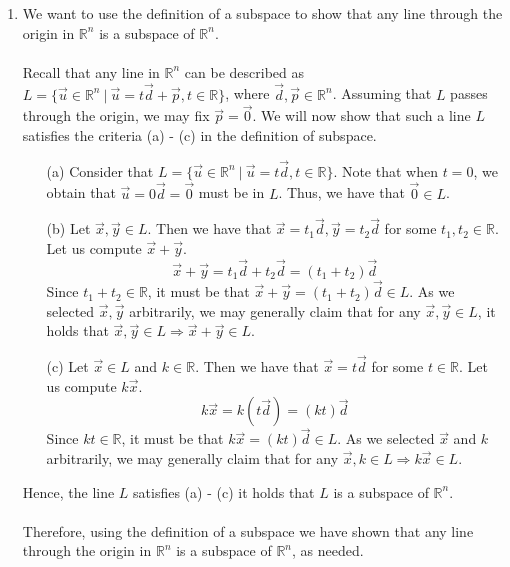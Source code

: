 \begin{SaveQuestion}
\begin{enumerate}
\begin{itemize}
        \end{itemize}
        \item We want to use the definition of a subspace to show that any line through the origin in $\mathbb{R}^n$ is a subspace of $\mathbb{R}^n$. \\ \\
        Recall that any line in $\mathbb{R}^n$ can be described as $L = \{\vec u \in \mathbb{R}^n \ | \ \vec u = t\vec d + \vec p, t \in \mathbb{R}\}$, where $\vec d, \vec p \in \mathbb{R}^n$. Assuming that $L$ passes through the origin, we may fix $\vec p = \vec 0$. We will now show that such a line $L$ satisfies the criteria (a) - (c) in the definition of subspace.
        \begin{enumerate}
            \item[(a)] Consider that $L = \{\vec u \in \mathbb{R}^n \ | \ \vec u = t\vec d, t \in \mathbb{R}\}$. Note that when $t = 0$, we obtain that $\vec u = 0 \vec d = \vec 0$ must be in $L$. Thus, we have that $\vec 0 \in L$. 
            \item[(b)] Let $\vec x, \vec y \in L$. Then we have that $\vec x = t_1 \vec d, \vec y = t_2 \vec d$ for some $t_1, t_2 \in \mathbb{R}$. Let us compute $\vec x + \vec y$. 
            $$\vec x + \vec y = t_1 \vec d + t_2 \vec d = (t_1 + t_2) \vec d$$
            Since $t_1 + t_2 \in \mathbb{R}$, it must be that $\vec x + \vec y = (t_1 + t_2)\vec d \in L$. As we selected $\vec x, \vec y$ arbitrarily, we may generally claim that for any $\vec x, \vec y \in L$, it holds that $\vec x, \vec y \in L \Longrightarrow \vec x + \vec y \in L$. 
            \item[(c)] Let $\vec x \in L$ and $k \in \mathbb{R}$. Then we have that $\vec x = t\vec d$ for some $t \in \mathbb{R}$. Let us compute $k \vec x$.
            $$k \vec x = k (t \vec d) = (kt) \vec d$$
            Since $kt \in \mathbb{R}$, it must be that $k \vec x = (kt) \vec d \in L$. As we selected $\vec x$ and $k$ arbitrarily, we may generally claim that for any $\vec x, k \in L \Longrightarrow k \vec x \in L$. 
        \end{enumerate}
        Hence, the line $L$ satisfies (a) - (c) it holds that $L$ is a subspace of $\mathbb{R}^n$. \\ \\
        Therefore, using the definition of a subspace we have shown that any line through the origin in $\mathbb{R}^n$ is a subspace of $\mathbb{R}^n$, as needed. 
    \end{enumerate}
\end{SaveQuestion}

